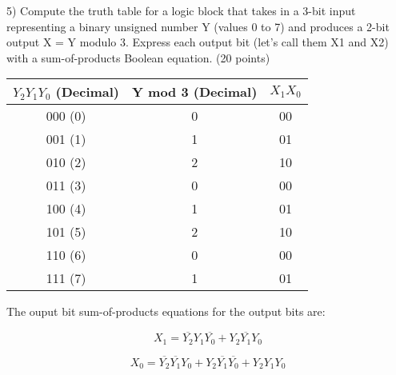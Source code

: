 \documentclass{article}
\begin{document}
\newpage

5) Compute the truth table for a logic block that takes in a 3-bit input representing a binary unsigned number Y (values 0 to 7) and produces a 2-bit output X = Y modulo 3. Express each output bit (let's call them X1 and X2) with a sum-of-products Boolean equation. (20 points)

\begin{center}
\begin{tabular}{||c c c||} 
    \hline
    $Y_2 Y_1 Y_0$ (Decimal) & Y mod 3 (Decimal) & $X_1 X_0$ \\ [0.5ex] 
    \hline\hline
    000 (0) & 0 & 00 \\ 
    \hline
    001 (1) & 1 & 01 \\
    \hline
    010 (2) & 2 & 10 \\
    \hline
    011 (3) & 0 & 00 \\
    \hline
    100 (4) & 1 & 01 \\
    \hline
    101 (5) & 2 & 10 \\
    \hline
    110 (6) & 0 & 00 \\
    \hline
    111 (7) & 1 & 01 \\ [1ex] 
    \hline
\end{tabular}
\end{center}

The ouput bit sum-of-products equations for the output bits are:

\[X_1 = \overline{Y_2} Y_1 \overline{Y_0} + Y_2 \overline{Y_1} Y_0\]

\[X_0 = \overline{Y_2} \overline{Y_1} Y_0 + Y_2 \overline{Y_1} \overline{Y_0} + Y_2 Y_1 Y_0\]
\end{document}
